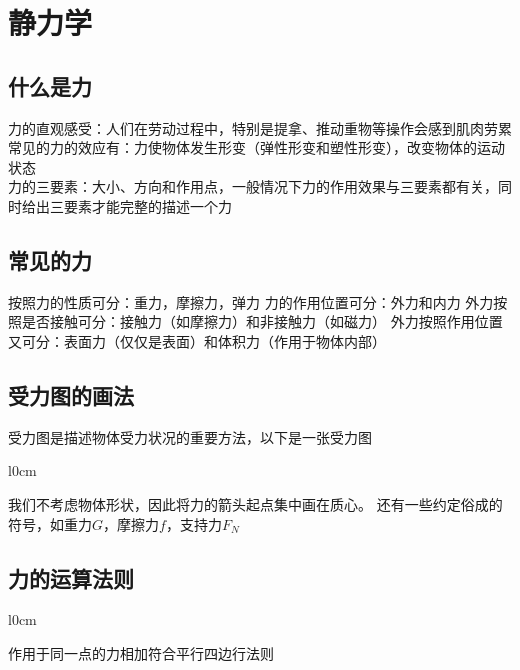 \chapter{静力学}
\section{什么是力}
力的直观感受：人们在劳动过程中，特别是提拿、推动重物等操作会感到肌肉劳累 \\
常见的力的效应有：力使物体发生形变（弹性形变和塑性形变），改变物体的运动状态 \\
力的三要素：大小、方向和作用点，一般情况下力的作用效果与三要素都有关，同时给出三要素才能完整的描述一个力 \\

\section{常见的力}
按照力的性质可分：重力，摩擦力，弹力
力的作用位置可分：外力和内力
外力按照是否接触可分：接触力（如摩擦力）和非接触力（如磁力）
外力按照作用位置又可分：表面力（仅仅是表面）和体积力（作用于物体内部）

\section{受力图的画法}
受力图是描述物体受力状况的重要方法，以下是一张受力图
\begin{wrapfigure}{l}{0cm}
\end{wrapfigure}
我们不考虑物体形状，因此将力的箭头起点集中画在质心。
还有一些约定俗成的符号，如重力$G$，摩擦力$f$，支持力$F_N$

\section{力的运算法则}
\begin{wrapfigure}{l}{0cm}
\end{wrapfigure}
作用于同一点的力相加符合平行四边行法则


